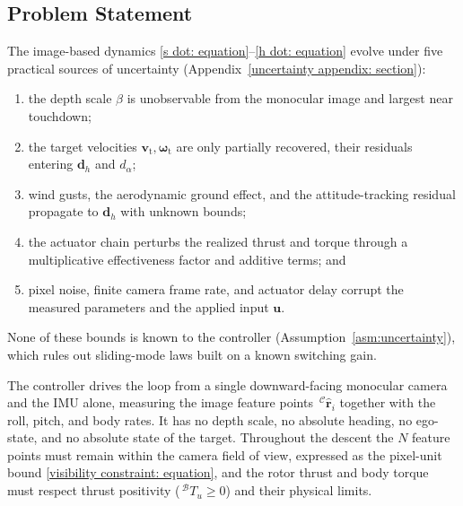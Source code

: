 \documentclass{IEEEtaes}
\theoremstyle{definition}
\theoremstyle{remark}
\begin{document}
\subsection{Problem Statement} \label{problem statement: section}
The image-based dynamics \eqref{s dot: equation}--\eqref{h dot: equation} evolve under five practical sources of uncertainty (Appendix~\ref{uncertainty appendix: section}):
\begin{enumerate}
    \item the depth scale $\beta$ is unobservable from the monocular image and largest near touchdown;
    \item the target velocities $\boldsymbol{v}_\text{t},\boldsymbol{\omega}_\text{t}$ are only partially recovered, their residuals entering $\boldsymbol{d}_h$ and $d_\alpha$;
    \item wind gusts, the aerodynamic ground effect, and the attitude-tracking residual propagate to $\boldsymbol{d}_h$ with unknown bounds;
    \item the actuator chain perturbs the realized thrust and torque through a multiplicative effectiveness factor and additive terms; and
    \item pixel noise, finite camera frame rate, and actuator delay corrupt the measured parameters and the applied input $\boldsymbol{u}$.
\end{enumerate}
None of these bounds is known to the controller (Assumption~\ref{asm:uncertainty}), which rules out sliding-mode laws built on a known switching gain.

The controller drives the loop from a single downward-facing monocular camera and the IMU alone, measuring the image feature points $\,^\mathcal{C}\hat{\boldsymbol{r}}_i$ together with the roll, pitch, and body rates. It has no depth scale, no absolute heading, no ego-state, and no absolute state of the target. Throughout the descent the $N$ feature points must remain within the camera field of view, expressed as the pixel-unit bound \eqref{visibility constraint: equation}, and the rotor thrust and body torque must respect thrust positivity ($\,^\mathcal{B}T_u\ge 0$) and their physical limits.
\end{document}
